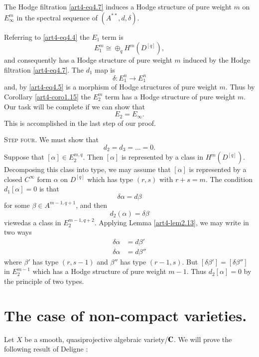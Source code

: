 \begin{lemma}\label{art4-lem4.8}
The Hodge filtration \eqref{art4-eq4.7} induces a Hodge structure of pure weight $m$ on $E^m_\infty$ in the spectral sequence of $(A^{\ast\ast}, d, \delta)$.
\end{lemma}

Referring to \eqref{art4-eq4.4} the $E_1$ term is 
$$
E^m_1 \cong \oplus_q H^m (D^{[q]}),
$$
and consequently has a Hodge structure of pure weight $m$ induced by the Hodge filtration \eqref{art4-eq4.7}. The $d_1$ map is
$$
\delta : E^n _1 \to E^n_1
$$
and, by \eqref{art4-eq4.5} is a morphism of Hodge structures of pure weight $m$. Thus by Corollary \eqref{art4-coro1.15} the $E^m_2$ term has a Hodge structure of pure weight $m$. Our task will be complete if we can show that 
\begin{equation}
E_2 = E_\infty.
\label{art4-eq4.9}
\end{equation}
This is accomplished in the last step of our proof.

\textsc{Step four.} We must show that 
$$
d_2 = d_3 = \ldots = 0.
$$
Suppose that $[\alpha] \in E^{m,q}_2$. Then $[\alpha]$ is represented by a class in $H^m (D^{[q]})$. Decomposing this class into type, we may assume that $[\alpha]$ is represented by a closed $C^\infty$ form $\alpha$ on $D^{[q]}$ which has type $(r,s)$ with $r + s = m$.  The condition $d_1 [\alpha] =0$ is that
\begin{equation}
\label{art4-eq4.10}
\delta \alpha = d \beta 
\end{equation}
for some $\beta\in A^{m-1, q+1}$, and then 
$$
d_2 (\alpha) = \delta \beta
$$
viewed\pageoriginale as a class in $E^{m-1, q+2}_2$. Applying Lemma \eqref{art4-lem2.13}, we may write in two ways
\begin{align*}
\delta \alpha & = d \beta'\\
\delta \alpha & = d \beta''
\end{align*}
where $\beta'$ has type $(r, s-1)$ and $\beta''$ has type $(r-1, s)$. But $[\delta \beta'] = [\delta \beta'']$ in $E^{m-1}_2$ which has a Hodge structure of pure weight $m-1$. Thus $d_2 [\alpha] = 0$ by the principle of two types.

\section{The case of non-compact varieties.}\label{art4-sec5}
Let $X$ be a smooth, quasiprojective algebraic variety/$\mathbf{C}$. We will prove the following result of Deligne \cite{art4-key13}:

